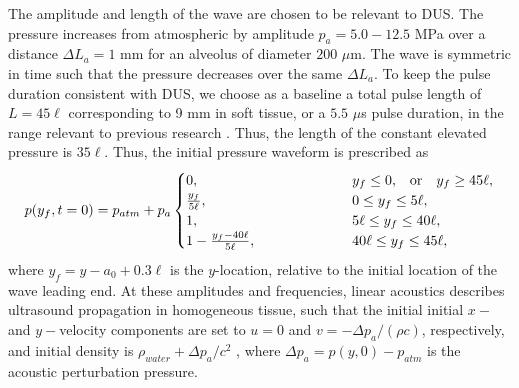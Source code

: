 \documentclass{jfm}%
\begin{document}
The amplitude and length of the wave are chosen to be relevant to
\ac{DUS}.  The pressure increases from atmospheric by amplitude
$p_a=5.0-12.5$ MPa over a distance $\Delta L_a = 1$ mm for an alveolus
of diameter $200$ $\mu$m.  The wave is symmetric in time such that the
pressure decreases over the same $\Delta L_a$. To keep the pulse
duration consistent with DUS, we choose as a baseline a total pulse
length of $L=45\ell$ corresponding to 9 mm in soft tissue, or a $5.5$
$\mu$s pulse duration, in the range relevant to previous research
\citep{Child1990,OBrien2006b}. Thus, the length of the constant
elevated pressure is $35\ell$. Thus, the initial pressure waveform
is prescribed as
\begin{align}
  \label{eq:p0}
  p(y_f,t=0) = p_{atm} + p_a %
    \begin{cases}
      0,&y_f\leq0 ,\quad$or$\quad y_f\geq45\ell,\\%
      \frac{y_f}{5\ell},&0\leq y_f\leq5\ell,\\%
      1,&5\ell\leq y_f\leq40\ell,\\%
      1-\frac{y_f-40\ell}{5\ell},\qquad\qquad\qquad&40\ell\leq y_f\leq45\ell,%
  \end{cases}%
\end{align}
where $y_f = y - a_0+0.3\ell$ is the $y$-location, relative to the initial location of the wave leading
end. At these amplitudes and frequencies, linear acoustics describes
ultrasound propagation in homogeneous tissue, such that the initial
initial $x-$ and $y-$velocity components are set to $u=0$ and
$v=-\Delta p_a / (\rho c)$, respectively, and initial density is
$\rho_{water} + \Delta p_a / c^2$ \citep{Anderson1990}, where
$\Delta p_a=p(y,0)-p_{atm}$ is the acoustic perturbation pressure.
\end{document}
